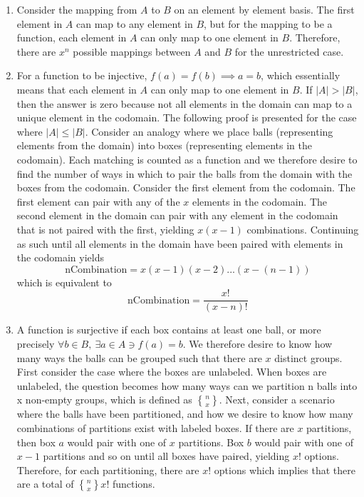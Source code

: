 \documentclass{article}
\begin{document}
\begin{enumerate}
\item Consider the mapping from $A$ to $B$ on an element by element basis. The first element in $A$ can map to any element in $B$, but for the mapping to be a function, each element in $A$ can only map to one element in $B$. Therefore, there are $x^n$ possible mappings between $A$ and $B$ for the unrestricted case. 
\item For a function to be injective, $f(a) = f(b) \implies a = b$, which essentially means that each element in $A$ can only map to one element in $B$. If $\lvert A \rvert > \lvert B \rvert$, then the answer is zero because not all elements in the domain can map to a unique element in the codomain. The following proof is presented for the case where $\lvert A \rvert \le \lvert B \rvert$. Consider an analogy where we place balls (representing elements from the domain) into boxes (representing elements in the codomain). Each matching is counted as a function and we therefore desire to find the number of ways in which to pair the balls from the domain with the boxes from the codomain. Consider the first element from the codomain.  The first element can pair with any of the $x$ elements in the codomain. The second element in the domain can pair with any element in the codomain that is not paired with the first, yielding $x(x - 1)$ combinations. Continuing as such until all elements in the domain have been paired with elements in the codomain yields 
\begin{equation*}
	\text{nCombination} = x(x-1)(x-2)...(x-(n-1))
\end{equation*}
which is equivalent to 
\begin{equation*}
\text{nCombination} = \frac{x!}{(x - n)!}
\end{equation*}
\item A function is surjective if each box contains at least one ball, or more precisely $\forall b \in B, \ \exists a \in A \ni f(a) = b$. We therefore desire to know how many ways the balls can be grouped such that there are $x$ distinct groups. First consider the case where the boxes are unlabeled. When boxes are unlabeled, the question becomes how many ways can we partition n balls into x non-empty groups, which is defined as ${n \brace x}$. Next, consider a scenario where the balls have been partitioned, and how we desire to know how many combinations of partitions exist with labeled boxes. If there are $x$ partitions, then box $a$ would pair with one of $x$ partitions. Box $b$ would pair with one of $x - 1$ partitions and so on until all boxes have paired, yielding $x!$ options. Therefore, for each partitioning, there are $x!$ options which implies that there are a total of ${n \brace x}x!$ functions.

\end{enumerate}
\end{document}
